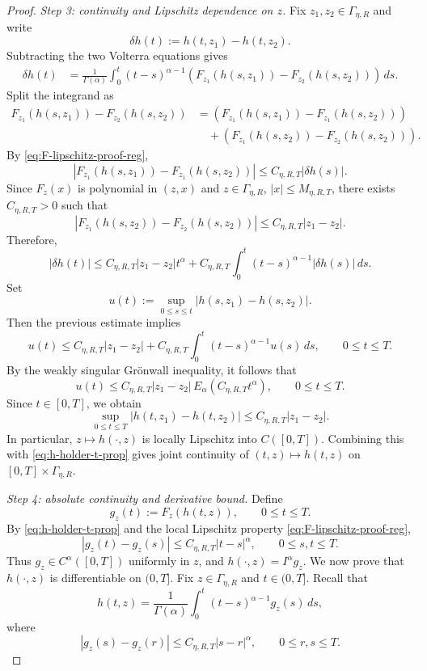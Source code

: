 \documentclass[10pt,a4paper]{amsart}
\begin{document}
\begin{proof}
\medskip
\noindent
\textit{Step 3: continuity and Lipschitz dependence on $z$.}
Fix $z_1,z_2\in\Gamma_{\eta,R}$ and write
\[
  \delta h(t):=h(t,z_1)-h(t,z_2).
\]
Subtracting the two Volterra equations gives
\begin{align*}
  \delta h(t)
  &=
  \frac{1}{\Gamma(\alpha)}
  \int_0^t (t-s)^{\alpha-1}
  \left(F_{z_1}(h(s,z_1))-F_{z_2}(h(s,z_2))\right)\,ds.
\end{align*}
Split the integrand as
\begin{align*}
  F_{z_1}(h(s,z_1))-F_{z_2}(h(s,z_2))
  &=
  \left(F_{z_1}(h(s,z_1))-F_{z_1}(h(s,z_2))\right)
  \\
  &\quad+
  \left(F_{z_1}(h(s,z_2))-F_{z_2}(h(s,z_2))\right).
\end{align*}
By \eqref{eq:F-lipschitz-proof-reg},
\[
  \left|F_{z_1}(h(s,z_1))-F_{z_1}(h(s,z_2))\right|
  \le C_{\eta,R,T}|\delta h(s)|.
\]
Since $F_z(x)$ is polynomial in $(z,x)$ and $z\in\Gamma_{\eta,R}$, $|x|\le
M_{\eta,R,T}$, there exists $C_{\eta,R,T}>0$ such that
\[
  \left|F_{z_1}(h(s,z_2))-F_{z_2}(h(s,z_2))\right|
  \le C_{\eta,R,T}|z_1-z_2|.
\]
Therefore,
\[
  |\delta h(t)|
  \le
  C_{\eta,R,T}|z_1-z_2|t^\alpha
  +
  C_{\eta,R,T}
  \int_0^t (t-s)^{\alpha-1}|\delta h(s)|\,ds.
\]
Set
\[
u(t):=\sup_{0\le s\le t}|h(s,z_1)-h(s,z_2)|.
\]
Then the previous estimate implies
\[
u(t)\le C_{\eta,R,T}|z_1-z_2|
   +C_{\eta,R,T}\int_0^t (t-s)^{\alpha-1}u(s)\,ds,
   \qquad 0\le t\le T.
\]
By the weakly singular Gr\"onwall inequality, it follows that
\[
u(t)\le C_{\eta,R,T}|z_1-z_2|\,E_\alpha(C_{\eta,R,T}t^\alpha),
\qquad 0\le t\le T.
\]
Since $t\in[0,T]$, we obtain
\[
\sup_{0\le t\le T}|h(t,z_1)-h(t,z_2)|
\le C_{\eta,R,T}|z_1-z_2|.
\]
In particular, $z\mapsto h(\cdot,z)$ is locally Lipschitz into $C([0,T])$.
Combining this with \eqref{eq:h-holder-t-prop} gives joint continuity of
$(t,z)\mapsto h(t,z)$ on $[0,T]\times\Gamma_{\eta,R}$.

\medskip
\noindent
\textit{Step 4: absolute continuity and derivative bound.}
Define
\[
  g_z(t):=F_z(h(t,z)),\qquad 0\le t\le T.
\]
By \eqref{eq:h-holder-t-prop} and the local Lipschitz property
\eqref{eq:F-lipschitz-proof-reg},
\[
  |g_z(t)-g_z(s)|\le C_{\eta,R,T}|t-s|^\alpha,
  \qquad 0\le s,t\le T.
\]
Thus $g_z\in C^\alpha([0,T])$ uniformly in $z$, and
$h(\cdot,z)=I^\alpha g_z$.
We now prove that $h(\cdot,z)$ is differentiable on $(0,T]$.
Fix $z\in\Gamma_{\eta,R}$ and $t\in(0,T]$. Recall that
\[
  h(t,z)=\frac{1}{\Gamma(\alpha)}\int_0^t (t-s)^{\alpha-1}g_z(s)\,ds,
\]
where
\[
  |g_z(s)-g_z(r)|\le C_{\eta,R,T}|s-r|^\alpha,
  \qquad 0\le r,s\le T.
\]


\end{proof}
\end{document}
